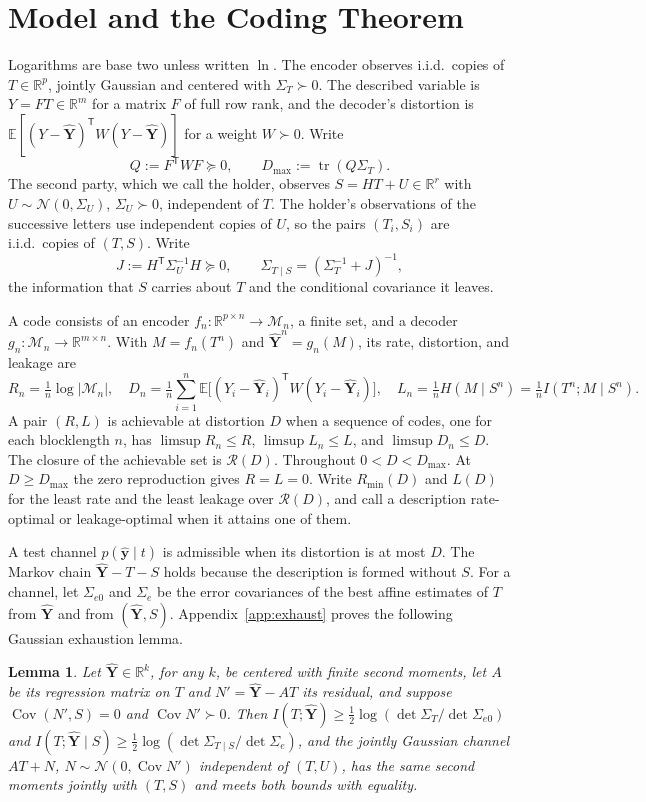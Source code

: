 \documentclass[11pt,onecolumn]{IEEEtran}
\newtheorem{lemma}[theorem]{Lemma}
\newcommand{\E}{\mathbb{E}}
\newcommand{\R}{\mathbb{R}}
\newcommand{\tr}{\operatorname{tr}}
\newcommand{\Cov}{\operatorname{Cov}}
\newcommand{\hY}{\hat{\mathbf Y}}
\newcommand{\hy}{\hat{\mathbf y}}
\newcommand{\RW}{\mathcal{R}}
\newcommand{\Se}{\Sigma_{e}}
\newcommand{\Sez}{\Sigma_{e0}}
\newcommand{\Kc}{\Sigma_{T\mid S}}
\begin{document}
\section{Model and the Coding Theorem}
\label{sec:model}

Logarithms are base two unless written $\ln$. The encoder observes
i.i.d.\ copies of $T\in\R^p$, jointly Gaussian and centered with
$\Sigma_T\succ0$. The described variable is $Y=FT\in\R^m$ for a matrix
$F$ of full row rank, and the decoder's distortion is
$\E[(Y-\hY)^{\mathsf T}W(Y-\hY)]$ for a weight $W\succ0$. Write
\[
Q:=F^{\mathsf T}WF\succeq0,
\qquad
D_{\max}:=\tr(Q\Sigma_T).
\]
The second party, which we call the holder, observes $S=HT+U\in\R^r$
with $U\sim\mathcal N(0,\Sigma_U)$, $\Sigma_U\succ0$, independent of $T$. The holder's
observations of the successive letters use independent copies of $U$,
so the pairs $(T_i,S_i)$ are i.i.d.\ copies of $(T,S)$. Write
\[
J:=H^{\mathsf T}\Sigma_U^{-1}H\succeq0,
\qquad
\Kc=(\Sigma_T^{-1}+J)^{-1},
\]
the information that $S$ carries about $T$ and the conditional
covariance it leaves.

A code consists of an encoder $f_n:\R^{p\times n}\to\mathcal M_n$, a finite
set, and a decoder $g_n:\mathcal M_n\to\R^{m\times n}$. With $M=f_n(T^n)$
and $\hY^n=g_n(M)$, its rate, distortion, and leakage are
\[
R_n=\tfrac1n\log|\mathcal M_n|,\quad
D_n=\tfrac1n\sum_{i=1}^n\E\bigl[(Y_i-\hY_i)^{\mathsf T}W(Y_i-\hY_i)\bigr],\quad
L_n=\tfrac1nH(M\mid S^n)=\tfrac1nI(T^n;M\mid S^n).
\]
A pair $(R,L)$ is achievable at distortion $D$ when a sequence of codes,
one for each blocklength $n$,
has $\limsup R_n\le R$, $\limsup L_n\le L$, and $\limsup D_n\le D$. The
closure of the achievable set is $\RW(D)$. Throughout $0<D<D_{\max}$. At
$D\ge D_{\max}$ the zero reproduction gives $R=L=0$. Write $R_{\min}(D)$
and $L(D)$ for the least rate and the least leakage over $\RW(D)$, and
call a description rate-optimal or leakage-optimal when it attains one
of them.

A test channel $p(\hy\mid t)$ is admissible when its distortion is at
most $D$. The Markov chain $\hY-T-S$ holds because the description is
formed without $S$. For a channel, let $\Sez$ and $\Se$ be the error
covariances of the best affine estimates of $T$ from $\hY$ and from
$(\hY,S)$. Appendix~\ref{app:exhaust} proves the following Gaussian
exhaustion lemma.

\begin{lemma}\label{lem:gauss}
Let $\hY\in\R^k$, for any $k$, be centered with finite second moments, let $A$ be its
regression matrix on $T$ and $N'=\hY-AT$ its residual, and suppose
$\Cov(N',S)=0$ and $\Cov N'\succ0$. Then
$I(T;\hY)\ge\tfrac12\log(\det\Sigma_T/\det\Sez)$ and
$I(T;\hY\mid S)\ge\tfrac12\log(\det\Kc/\det\Se)$, and the jointly
Gaussian channel $AT+N$, $N\sim\mathcal N(0,\Cov N')$ independent of
$(T,U)$, has the same second moments jointly with $(T,S)$ and meets both bounds with
equality.
\end{lemma}
\end{document}
